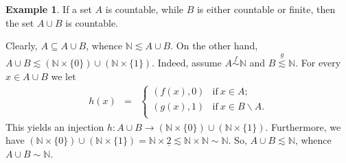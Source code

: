 \documentclass[12pt,notitlepage]{article}
\theoremstyle{plain}
\newtheorem{lemma}[thm]{Lemma}
\theoremstyle{definition}
\newtheorem{exm}[thm]{Example}
\theoremstyle{plain}
\newcommand{\N}{\mathbb{N}}
\newcommand{\sbs}{\subseteq}
\renewcommand{\setminus}{\smallsetminus}
\renewcommand{\phi}{\varphi}
\newcommand{\ul}[1]{\underline{#1}}
\newcommand{\1}{\mathbf{1}}
\newcommand{\0}{\mathbf{0}}
\begin{document}
\begin{exm}\label{L10:2_union}
If a set $A$ is countable, while $B$ is either countable or finite, then the set $A \cup B$ is countable.

Clearly, $A \sbs A \cup B$, whence $\N \lesssim A \cup B$. On the other hand, $A \cup B \lesssim (\N \times \{ 0 \}) \cup (\N \times \{ 1 \})$. Indeed, assume $A \stackrel{f}{\sim} \N$ and $B \stackrel{g}{\lesssim} \N$. For every $x \in A \cup B$ we let
$$
\begin{array}{rcll}
h(x) &=&\begin{cases}
		(f(x),0)& \mbox{if}\ x \in A;\\
		(g(x),1)& \mbox{if}\ x \in B \setminus A.\\
		\end{cases}
\end{array}
$$
This yields an injection $h\colon A \cup B \to (\N \times \{ 0 \}) \cup (\N \times \{ 1 \})$. Furthermore, we have $(\N \times \{ 0 \}) \cup (\N \times \{ 1 \}) = \N \times \ul{2} \lesssim \N \times \N \sim \N$. So, $A \cup B \lesssim \N$, whence $A \cup B \sim \N$.
\end{exm}
%
%
%
\end{document}
